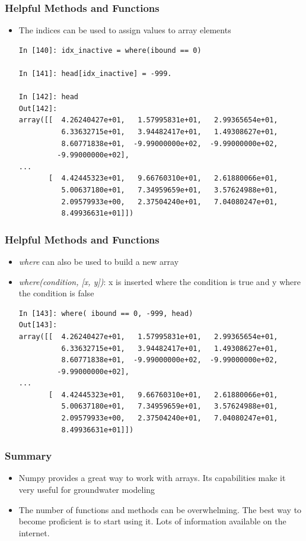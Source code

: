 \documentclass{beamer}
\begin{document}
\begin{frame}[fragile]
\frametitle{Helpful Methods and Functions}
  \begin{itemize}
    \item{The indices can be used to assign values to array elements}
    \begin{lstlisting}
In [140]: idx_inactive = where(ibound == 0)

In [141]: head[idx_inactive] = -999.

In [142]: head
Out[142]:
array([[  4.26240427e+01,   1.57995831e+01,   2.99365654e+01,
          6.33632715e+01,   3.94482417e+01,   1.49308627e+01,
          8.60771838e+01,  -9.99000000e+02,  -9.99000000e+02,
         -9.99000000e+02],
...
       [  4.42445323e+01,   9.66760310e+01,   2.61880066e+01,
          5.00637180e+01,   7.34959659e+01,   3.57624988e+01,
          2.09579933e+00,   2.37504240e+01,   7.04080247e+01,
          8.49936631e+01]])
    \end{lstlisting}
  \end{itemize}
\end{frame}

\begin{frame}[fragile]
\frametitle{Helpful Methods and Functions}
  \begin{itemize}
    \item{\emph{where} can also be used to build a new array}
    \item{\emph{where(condition, [x, y])}: x is inserted where the condition is true and y where the condition is false}
    \begin{lstlisting}
In [143]: where( ibound == 0, -999, head)
Out[143]:
array([[  4.26240427e+01,   1.57995831e+01,   2.99365654e+01,
          6.33632715e+01,   3.94482417e+01,   1.49308627e+01,
          8.60771838e+01,  -9.99000000e+02,  -9.99000000e+02,
         -9.99000000e+02],
...
       [  4.42445323e+01,   9.66760310e+01,   2.61880066e+01,
          5.00637180e+01,   7.34959659e+01,   3.57624988e+01,
          2.09579933e+00,   2.37504240e+01,   7.04080247e+01,
          8.49936631e+01]])
    \end{lstlisting}
  \end{itemize}
\end{frame}


\begin{frame}[fragile]
\frametitle{Summary}
\begin{itemize}
  \item{Numpy provides a great way to work with arrays.  Its capabilities make it very useful for groundwater modeling}
  \item{The number of functions and methods can be overwhelming.  The best way to become proficient is to start using it.  Lots of information available on the internet.}
\end{itemize}
\end{frame}
\end{document}

